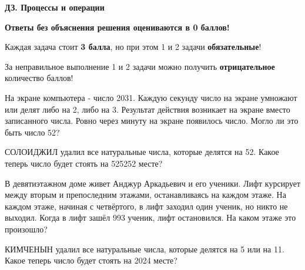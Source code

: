 \centerline{\bf \Huge ДЗ. Процессы и операции}
\centerline{\bf \Huge }

\begin{flushright}
        \scriptsize{\textbf{Ответы без объяснения решения оцениваются в 0 баллов!}}
\end{flushright}

Каждая задача стоит \textbf{3 балла}, но при этом 1 и 2 задачи \textbf{обязательные}! 

За неправильное выполнение 1 и 2 задачи можно получить \textbf{отрицательное} количество баллов!

 На экране компьютера - число 2031. Каждую секунду число на экране умножают или делят либо на 2, либо на 3. Результат действия возникает на экране вместо записанного числа. Ровно через минуту на экране появилось число. Могло ли это быть число 52? 


 СОЛОИДЖИЛ удалил все натуральные числа, которые делятся на 52. Какое теперь число будет стоять на 525252 месте?

 В девятиэтажном доме живет Анджур Аркадьевич и его ученики. Лифт курсирует между вторым и препоследним этажами, останавливаясь на каждом этаже. На каждом этаже, начиная с четвёртого, в лифт заходил один ученик, но никто не выходил. Когда в лифт зашёл 993 ученик, лифт остановился. На каком этаже это произошло?


  КИМЧЕНЫН удалил все натуральные числа, которые делятся на 5 или на 11. Какое теперь число будет стоять на 2024 месте?